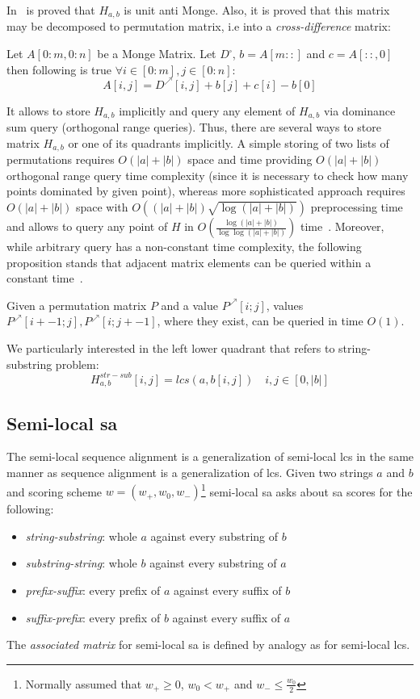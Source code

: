 In~\cite{tiskin2008semi} is proved that $H_{a,b}$ is unit anti Monge.
Also, it is proved that this matrix may be decomposed to permutation matrix, i.e into a \emph{cross-difference} matrix:
\begin{theorem}\cite{tiskin2008semi}\label{decomposition}
Let $A[0:m,0:n]$ be a Monge Matrix. Let $D^{\square}$, $b=A[m::]$ and $c=A[::,0]$ then following is true $\forall i \in [0:m],j\in [0:n]$:
$$ A[i,j] = D^{\nearrow}[i,j]+b[j]+c[i]-b[0] $$ 
\end{theorem}
It allows to store $H_{a,b}$ implicitly and query any element of $H_{a,b}$ via dominance sum query (orthogonal range queries).
Thus, there are several ways to store matrix $H_{a,b}$ or one of its quadrants implicitly.
A simple storing of two lists of permutations requires $O(|a|+|b|)$ space and time providing $O(|a|+|b|)$ orthogonal range query time complexity (since it is necessary to check how many points dominated by given point), whereas more sophisticated approach requires $O(|a|+|b|)$ space with $O( (|a|+|b|) \sqrt{\log{ (|a| +|b|)} } )$ preprocessing time and allows to query any point of $H$ in $O(\frac{\log (|a|+|b|)}{\log \log (|a|+|b|)})$ time~\cite{chan2010counting}.  
Moreover, while arbitrary query has a non-constant time complexity, the following proposition stands that adjacent matrix elements can be queried within a constant time~\cite{tiskin2008semi}.
\begin{proposition}\label{incremental}
  Given a permutation matrix $P$ and a value $P^{\nearrow}[i; j]$,
  values $P^{\nearrow}[i +- 1; j], P^{\nearrow}[i; j +- 1]$, where they exist,
  can be queried in time $O(1)$.
\end{proposition}

We particularly interested in the left lower quadrant that refers to string-substring problem:
\begin{equation}
H_{a,b}^{str-sub}[i,j] = lcs(a,b[i,j]) \quad i,j \in [0,|b|] 
\end{equation}

\subsection{Semi-local sa}
The semi-local sequence alignment is a generalization of semi-local lcs in the same manner as sequence alignment is a generalization of lcs.
Given two strings $a$ and $b$ and scoring scheme $w=(w_{+},w_{0},w_{-})$\footnote{Normally assumed that $w_{+}\geq 0$, $w_{0} < w_{+}$ and $w_{-}\leq \frac{w_{0}}{2}$}  semi-local sa asks about sa scores for the following:
\begin{itemize}
\item \emph{string-substring}: whole $a$ against every substring of $b$
\item \emph{substring-string}: whole $b$ against every substring of $a$
\item \emph{prefix-suffix}: every prefix of $a$ against every suffix of $b$
\item \emph{suffix-prefix}: every prefix of $b$ against every suffix of $a$
\end{itemize} 
The \emph{associated matrix} for semi-local sa is defined by analogy as for semi-local lcs.

